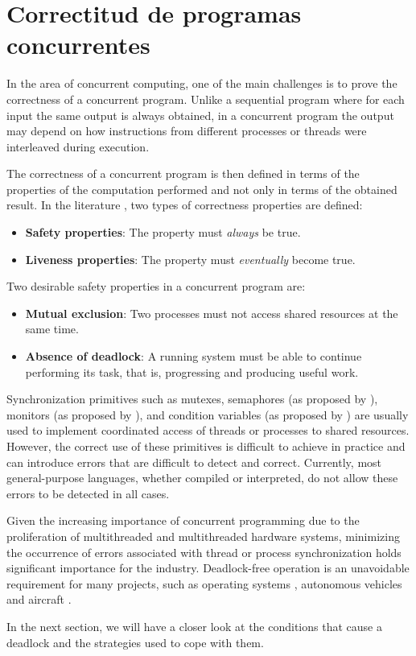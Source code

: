 \section{Correctitud de programas concurrentes}

In the area of concurrent computing, one of the main challenges is
to prove the correctness of a concurrent program.
Unlike a sequential program where for each input the same output
is always obtained, in a concurrent program the output may depend
on how instructions from different processes or
threads were interleaved during execution.

The correctness of a concurrent program is then defined
in terms of the properties of the computation performed
and not only in terms of the obtained result.
In the literature \cite{ben-ari2006,coulouris2012,tanenbaum2017},
two types of correctness properties are defined:

\begin{itemize}
    \item \textbf{Safety properties}: The property must \emph{always} be true.
    \item \textbf{Liveness properties}: The property must \emph{eventually} become true.
\end{itemize}

Two desirable safety properties in a concurrent program are:

\begin{itemize}
    \item \textbf{Mutual exclusion}: Two processes must not access shared resources at the same time.
    \item \textbf{Absence of deadlock}: A running system must be able to continue performing its task,
          that is, progressing and producing useful work.
\end{itemize}

Synchronization primitives such as mutexes,
semaphores (as proposed by \cite{Dijkstra2002}),
monitors (as proposed by \cite{hansen1972structured,hansen1973operating}),
and condition variables (as proposed by \cite{hoare1974monitors}) are usually used
to implement coordinated access of threads or processes to shared resources.
However, the correct use of these primitives is difficult to achieve in practice
and can introduce errors that are difficult to detect and correct.
Currently, most general-purpose languages, whether compiled or interpreted,
do not allow these errors to be detected in all cases.

Given the increasing importance of concurrent programming due to the proliferation
of multithreaded and multithreaded hardware systems,
minimizing the occurrence of errors associated with thread or process synchronization
holds significant importance for the industry.
Deadlock-free operation is an unavoidable requirement for many projects, such as
operating systems \cite{ArpaciDusseau2018}, autonomous vehicles \cite{Perronnet2019}
and aircraft \cite{carreno2005safety,monzon2009deadlock}.

In the next section, we will have a closer look at the conditions that cause a deadlock
and the strategies used to cope with them.